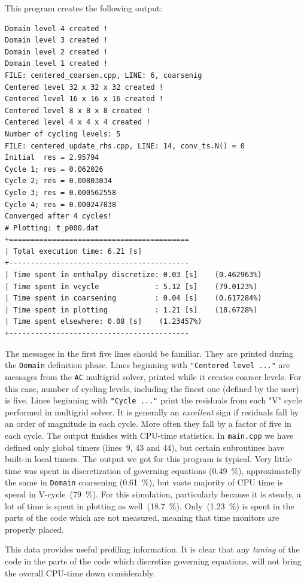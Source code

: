 This program creates the following output:
%
{\small \begin{verbatim}
Domain level 4 created !
Domain level 3 created !
Domain level 2 created !
Domain level 1 created !
FILE: centered_coarsen.cpp, LINE: 6, coarsenig
Centered level 32 x 32 x 32 created !
Centered level 16 x 16 x 16 created !
Centered level 8 x 8 x 8 created !
Centered level 4 x 4 x 4 created !
Number of cycling levels: 5
FILE: centered_update_rhs.cpp, LINE: 14, conv_ts.N() = 0
Initial  res = 2.95794
Cycle 1; res = 0.062026
Cycle 2; res = 0.00803034
Cycle 3; res = 0.000562558
Cycle 4; res = 0.000247838
Converged after 4 cycles!
# Plotting: t_p000.dat
+==========================================
| Total execution time: 6.21 [s]
+------------------------------------------
| Time spent in enthalpy discretize: 0.03 [s]    (0.462963%)
| Time spent in vcycle             : 5.12 [s]    (79.0123%)
| Time spent in coarsening         : 0.04 [s]    (0.617284%)
| Time spent in plotting           : 1.21 [s]    (18.6728%)
| Time spent elsewhere: 0.08 [s]    (1.23457%)
+------------------------------------------
\end{verbatim}}
% 
The messages in the first five lines should be familiar. They are printed 
during the {\tt Domain} definition phase. Lines beginning with 
{\tt"Centered level ..."} are messages from the {\tt AC} multigrid solver, 
printed while it creates coarser levels. For this case, number of cycling levels,
including the finest one (defined by the user) is five. Lines beginning
with {\tt"Cycle ..."} print the residuals from each "V" cycle performed
in multigrid solver. It is generally an {\em excellent} sign if residuals 
fall by an order of magnitude in each cycle. More often they fall by 
a factor of five in each cycle. 
The output finishes with CPU-time statistics. In {\tt main.cpp} we
have defined only global timers
(lines~9, 43 and 44), but certain {\psiboil} subroutines have built-in 
local timers.
The output we got for this
program is typical. Very little time was spent in discretization of
governing equations (0.49~\%), approximatelly the same in {\tt Domain} 
coarsening (0.61~\%), but vaste majority of CPU time is spend in
V-cycle~(79~\%). For this simulation, particularly because it is
steady, a lot of time is spent in plotting as well~(18.7~\%). Only~(1.23~\%)
is spent in the parts of the code which are not measured, meaning that 
time monitors are properly placed. 

This data provides useful profiling information. It is
clear that any {\em tuning} of the code in the parts of the code which
discretize governing equations, will not bring the overall CPU-time down
considerably. 

